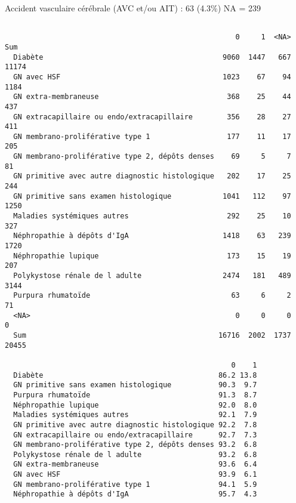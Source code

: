 \documentclass[11pt,a4paper]{article}\usepackage[]{graphicx}\usepackage[]{color}
\makeatletter
\newenvironment{kframe}{%
 \def\at@end@of@kframe{}%
 \ifinner\ifhmode%
  \def\at@end@of@kframe{\end{minipage}}%
  \begin{minipage}{\columnwidth}%
 \fi\fi%
 \def\FrameCommand##1{\hskip\@totalleftmargin \hskip-\fboxsep
 \colorbox{shadecolor}{##1}\hskip-\fboxsep
     \hskip-\linewidth \hskip-\@totalleftmargin \hskip\columnwidth}%
 \MakeFramed {\advance\hsize-\width
   \@totalleftmargin\z@ \linewidth\hsize
   \@setminipage}}%
 {\par\unskip\endMakeFramed%
 \at@end@of@kframe}
\newenvironment{knitrout}{}{} %
\makeatother
\begin{document}
Accident vasculaire cérébrale (AVC et/ou AIT) : 63 (4.3\%) NA = 239

\begin{knitrout}
\color{fgcolor}\begin{kframe}
\begin{verbatim}
                                                 
                                                      0     1  <NA>   Sum
  Diabète                                          9060  1447   667 11174
  GN avec HSF                                      1023    67    94  1184
  GN extra-membraneuse                              368    25    44   437
  GN extracapillaire ou endo/extracapillaire        356    28    27   411
  GN membrano-proliférative type 1                  177    11    17   205
  GN membrano-proliférative type 2, dépôts denses    69     5     7    81
  GN primitive avec autre diagnostic histologique   202    17    25   244
  GN primitive sans examen histologique            1041   112    97  1250
  Maladies systémiques autres                       292    25    10   327
  Néphropathie à dépôts d'IgA                      1418    63   239  1720
  Néphropathie lupique                              173    15    19   207
  Polykystose rénale de l adulte                   2474   181   489  3144
  Purpura rhumatoïde                                 63     6     2    71
  <NA>                                                0     0     0     0
  Sum                                             16716  2002  1737 20455
                                                 
                                                     0    1
  Diabète                                         86.2 13.8
  GN primitive sans examen histologique           90.3  9.7
  Purpura rhumatoïde                              91.3  8.7
  Néphropathie lupique                            92.0  8.0
  Maladies systémiques autres                     92.1  7.9
  GN primitive avec autre diagnostic histologique 92.2  7.8
  GN extracapillaire ou endo/extracapillaire      92.7  7.3
  GN membrano-proliférative type 2, dépôts denses 93.2  6.8
  Polykystose rénale de l adulte                  93.2  6.8
  GN extra-membraneuse                            93.6  6.4
  GN avec HSF                                     93.9  6.1
  GN membrano-proliférative type 1                94.1  5.9
  Néphropathie à dépôts d'IgA                     95.7  4.3
\end{verbatim}
\end{kframe}
\end{knitrout}
\end{document}

